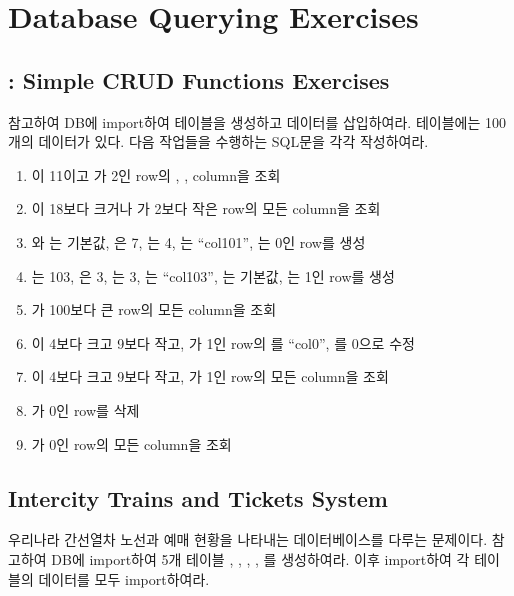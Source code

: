 \section{Database Querying Exercises}\label{sect:db-querying-exercises}

\subsection*{: Simple CRUD Functions Exercises}

\을 참고하여 DB에 \을 import하여 테이블을 생성하고 데이터를 삽입하여라.  테이블에는 100개의 데이터가 있다. 다음 작업들을 수행하는 SQL문을 각각 작성하여라.

\begin{enumerate}
    \item {}이 11이고 가 2인 row의 , ,  column을 조회
    \item {}이 18보다 크거나 가 2보다 작은 row의 모든 column을 조회
    \item {}와 는 기본값, 은 7, 는 4, 는 ``col101'', 는 0인 row를 생성
    \item {}는 103, 은 3, 는 3, 는 ``col103'', 는 기본값, 는 1인 row를 생성
    \item {}가 100보다 큰 row의 모든 column을 조회
    \item {}이 4보다 크고 9보다 작고, 가 1인 row의 를 ``col0'', 를 0으로 수정
    \item {}이 4보다 크고 9보다 작고, 가 1인 row의 모든 column을 조회
    \item {}가 0인 row를 삭제
    \item {}가 0인 row의 모든 column을 조회
\end{enumerate}

\subsection*{Intercity Trains and Tickets System}

\과 \는 우리나라 간선열차 노선과 예매 현황을 나타내는 데이터베이스를 다루는 문제이다. \을 참고하여 DB에 \를 import하여 5개 테이블 , , , , 를 생성하여라. 이후 \를 import하여 각 테이블의 데이터를 모두 import하여라.

